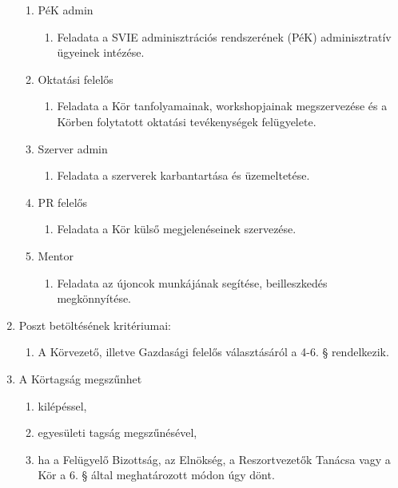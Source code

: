 \documentclass[12pt]{article}
\begin{document}
\begin{enumerate}
\begin{enumerate}
  \item PéK admin
    \begin{enumerate}
        \item Feladata a SVIE adminisztrációs rendszerének (PéK) adminisztratív ügyeinek intézése.
    \end{enumerate}

  \item Oktatási felelős
    \begin{enumerate}
        \item Feladata a Kör tanfolyamainak, workshopjainak megszervezése és a Körben folytatott oktatási tevékenységek felügyelete.
    \end{enumerate}

  \item Szerver admin
    \begin{enumerate}
        \item Feladata a szerverek karbantartása és üzemeltetése.
    \end{enumerate}

  \item PR felelős
    \begin{enumerate}
        \item Feladata a Kör külső megjelenéseinek szervezése.
    \end{enumerate}

  \item Mentor
    \begin{enumerate}
      \item Feladata az újoncok munkájának segítése, beilleszkedés megkönnyítése.
    \end{enumerate}

\end{enumerate} %


\item Poszt betöltésének kritériumai:

  \begin{enumerate}
    \item A Körvezető, illetve Gazdasági felelős választásáról a 4-6. § rendelkezik.
  \end{enumerate}

\item A Körtagság megszűnhet

  \begin{enumerate}
    \item kilépéssel,
    \item egyesületi tagság megszűnésével,
    \item ha a Felügyelő Bizottság, az Elnökség, a Reszortvezetők Tanácsa vagy a Kör a 6. § által meghatározott módon úgy dönt.
  \end{enumerate}

\end{enumerate} %
\end{document}
